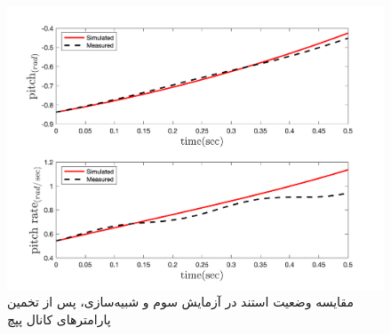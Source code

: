 \begin{figure}[H]
	\includegraphics[width=12cm]{../Figures/RCP/pitch_parameter_estimation/RCP_pitch_S3.png}
	\centering
	\caption{مقايسه وضعیت استند در  آزمايش سوم و شبیه‌سازی، پس از تخمین پارامترهای کانال پپچ}
	\label{pitch_ps3}
\end{figure}
